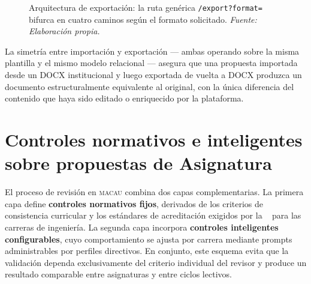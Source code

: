 \begin{figure}[H]
\shorthandon{<>}
\caption{Arquitectura de exportaci\'{o}n: la ruta gen\'{e}rica
  \texttt{/export?format=} bifurca en cuatro caminos seg\'{u}n el formato
  solicitado.
  \footnotesize\textit{Fuente: Elaboraci\'{o}n propia.}}
\label{fig:exportacion}
\end{figure}

La simetr\'{i}a entre importaci\'{o}n y exportaci\'{o}n --- ambas operando
sobre la misma plantilla y el mismo modelo relacional --- asegura que una
propuesta importada desde un DOCX institucional y luego exportada de vuelta
a DOCX produzca un documento estructuralmente equivalente al original, con la
\'{u}nica diferencia del contenido que haya sido editado o enriquecido por la
plataforma.

\section{Controles normativos e inteligentes sobre propuestas de Asignatura}
\label{sec:controles}

El proceso de revisi\'on en \textsc{macau} combina dos capas complementarias.
La primera capa define \textbf{controles normativos fijos}, derivados de los
crite\-rios de consistencia curricular y los est\'andares de acreditaci\'on
exigidos por la ~\cite{ordenanza75} para las carreras de ingenier\'ia. La segunda capa incorpora \textbf{controles
inteligentes configurables}, cuyo comportamiento se ajusta por carrera mediante
prompts administrables por perfiles directivos. En conjunto, este esquema evita
que la validación dependa exclusivamente del criterio individual del revisor y
produce un resultado comparable entre asignaturas y entre ciclos lectivos.

